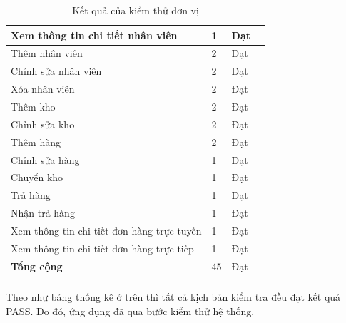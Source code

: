 {\begin{longtable}{| p{4cm}| p{4cm}| p{4cm}| p{4cm} |}
        \hline
        Xem thông tin chi tiết nhân viên  &  1              & Đạt             \\
        \hline
        Thêm nhân viên  &  2              & Đạt             \\
        \hline
        Chỉnh sửa nhân viên  &  2              & Đạt             \\
        \hline
        Xóa nhân viên  &  2              & Đạt             \\
        \hline
        Thêm kho  &  2              & Đạt             \\
        \hline
        Chỉnh sửa kho  &  2              & Đạt             \\
        \hline
        Thêm hàng  &  2              & Đạt             \\
        \hline
        Chỉnh sửa hàng  &  1              & Đạt             \\
        \hline
        Chuyển kho  &  1              & Đạt             \\
        \hline
        Trả hàng  &  1              & Đạt             \\
        \hline
        Nhận trả hàng  &  1              & Đạt             \\
        \hline
        Xem thông tin chi tiết đơn hàng trực tuyến  &  1              & Đạt             \\
        \hline
        Xem thông tin chi tiết đơn hàng trực tiếp  &  1              & Đạt             \\
        \hline
       \textbf{Tổng cộng}    &  45              & Đạt             \\
        \hline
        \caption{Kết quả của kiểm thử đơn vị}
    \end{longtable}
}

Theo như bảng thống kê ở trên thì tất cả kịch bản kiểm tra đều đạt kết quả PASS. Do đó, ứng dụng đã qua bước kiểm thử hệ thống.